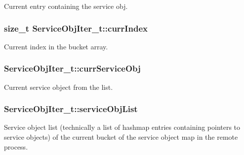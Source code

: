 Current entry containing the service obj. 

\subsubsection[{\texorpdfstring{curr\+Index}{currIndex}}]{\setlength{\rightskip}{0pt plus 5cm}size\+\_\+t Service\+Obj\+Iter\+\_\+t\+::curr\+Index}\hypertarget{struct_service_obj_iter__t_a3d5eca055cbc01d574d8f8b82fd7ff33}{}\label{struct_service_obj_iter__t_a3d5eca055cbc01d574d8f8b82fd7ff33}


Current index in the bucket array. 

\subsubsection[{\texorpdfstring{curr\+Service\+Obj}{currServiceObj}}]{ Service\+Obj\+Iter\+\_\+t\+::curr\+Service\+Obj}\hypertarget{struct_service_obj_iter__t_a7dffa77b0a4e5a7d171811e3f70f295a}{}\label{struct_service_obj_iter__t_a7dffa77b0a4e5a7d171811e3f70f295a}


Current service object from the list. 

\subsubsection[{\texorpdfstring{service\+Obj\+List}{serviceObjList}}]{ Service\+Obj\+Iter\+\_\+t\+::service\+Obj\+List}\hypertarget{struct_service_obj_iter__t_a6565ae4e4656a3aa2e657d198cbc6ba5}{}\label{struct_service_obj_iter__t_a6565ae4e4656a3aa2e657d198cbc6ba5}
Service object list (technically a list of hashmap entries containing pointers to service objects) of the current bucket of the service object map in the remote process. 
